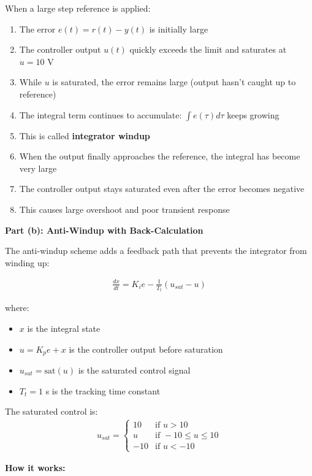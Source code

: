 \documentclass[11pt,a4paper]{article}
\begin{document}
When a large step reference is applied:

\begin{enumerate}
\item The error $e(t) = r(t) - y(t)$ is initially large
\item The controller output $u(t)$ quickly exceeds the limit and saturates at $u = 10$ V
\item While $u$ is saturated, the error remains large (output hasn't caught up to reference)
\item The integral term continues to accumulate: $\int e(\tau) d\tau$ keeps growing
\item This is called \textbf{integrator windup}
\item When the output finally approaches the reference, the integral has become very large
\item The controller output stays saturated even after the error becomes negative
\item This causes large overshoot and poor transient response
\end{enumerate}

\textbf{Part (b): Anti-Windup with Back-Calculation}

The anti-windup scheme adds a feedback path that prevents the integrator from winding up:

\begin{align}
\frac{dx}{dt} = K_i e - \frac{1}{T_t}(u_{sat} - u)
\end{align}

where:
\begin{itemize}
\item $x$ is the integral state
\item $u = K_p e + x$ is the controller output before saturation
\item $u_{sat} = \text{sat}(u)$ is the saturated control signal
\item $T_t = 1$ s is the tracking time constant
\end{itemize}

The saturated control is:
\begin{align}
u_{sat} = \begin{cases}
10 & \text{if } u > 10 \\
u & \text{if } -10 \leq u \leq 10 \\
-10 & \text{if } u < -10
\end{cases}
\end{align}

\textbf{How it works:}
\end{document}
